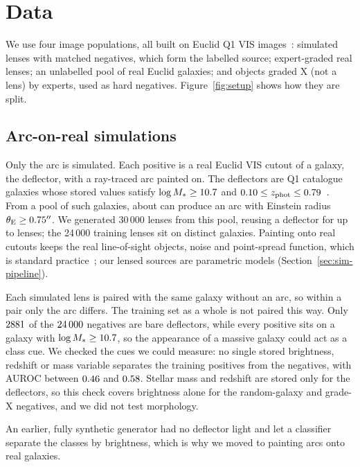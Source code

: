 \section{Data}
\label{sec:data}

We use four image populations, all built on Euclid Q1 VIS
images~\citep{euclidq1overview, euclidq1data}: simulated lenses with matched negatives, which
form the labelled source; expert-graded real lenses; an unlabelled pool of real Euclid
galaxies; and objects graded X (not a lens) by experts, used as hard negatives.
Figure~\ref{fig:setup} shows how they are split.

\subsection{Arc-on-real simulations}

Only the arc is simulated. Each positive is a real Euclid VIS cutout of a galaxy, the
deflector, with a ray-traced arc painted on. The deflectors are Q1 catalogue galaxies whose
stored values satisfy $\log M_* \geq 10.7{}$ and
$0.10{} \leq z_{\rm phot} \leq 0.79{}$~\citep{euclidq1phz}. From a pool of
\rwDeflPool{} such galaxies, about \rwDeflArc{} can produce an arc with Einstein radius
$\theta_{\rm E} \geq 0.75''$. We generated 30\,000 lenses from this pool, reusing a deflector
for up to \rwDeflReuse{} lenses; the 24\,000 training lenses sit on \rwDeflDistinct{} distinct
galaxies. Painting
onto real cutouts keeps the real line-of-sight objects, noise and point-spread function, which
is standard practice~\citep{holismokesXI, lines2025discoveryengineC, unions2025}; our lensed
sources are parametric models (Section~\ref{sec:sim-pipeline}).

Each simulated lens is paired with the same galaxy without an arc, so within a pair only the
arc differs. The training set as a whole is not paired this way. Only $2881{}$ of the
$24\,000{}$ negatives are bare deflectors, while every positive sits on a galaxy with
$\log M_* \geq 10.7{}$, so the appearance of a massive galaxy could act as a class
cue. We checked the cues we could measure: no single stored brightness, redshift or mass
variable separates the training positives from the negatives, with AUROC between
$0.46{}$ and $0.58{}$. Stellar mass and redshift are stored only for
the deflectors, so this check covers brightness alone for the random-galaxy and grade-X
negatives, and we did not test morphology.

An earlier, fully synthetic generator had no deflector light and let a classifier separate
the classes by brightness, which is why we moved to painting arcs onto real galaxies.

